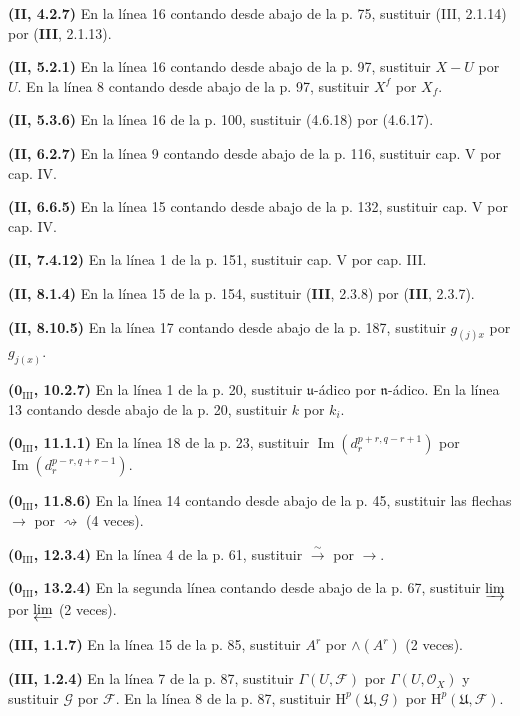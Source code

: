 \documentclass[10pt,oneside]{book}
\providecommand{\setmin}{-}%
\begin{document}
\noindent\textbf{(II, 4.2.7)} En la línea 16 contando desde abajo de la p. 75,
sustituir (III, 2.1.14) por (\textbf{III}, 2.1.13).

\noindent\textbf{(II, 5.2.1)} En la línea 16 contando desde abajo de la p. 97,
sustituir $X\setmin U$ por $U$. En la línea 8 contando desde abajo de la p. 97,
sustituir $X^f$ por $X_f$.

\noindent\textbf{(II, 5.3.6)} En la línea 16 de la p. 100, sustituir (4.6.18)
por (4.6.17).

\noindent\textbf{(II, 6.2.7)} En la línea 9 contando desde abajo de la p. 116,
sustituir cap. V por cap. IV.

\noindent\textbf{(II, 6.6.5)} En la línea 15 contando desde abajo de la p.
132, sustituir cap. V por cap. IV.

\noindent\textbf{(II, 7.4.12)} En la línea 1 de la p. 151, sustituir cap. V
por cap. III.

\noindent\textbf{(II, 8.1.4)} En la línea 15 de la p. 154, sustituir (\textbf{III},
2.3.8) por (\textbf{III}, 2.3.7).

\noindent\textbf{(II, 8.10.5)} En la línea 17 contando desde abajo de la p.
187, sustituir $g_{(j)x}$ por $g_{j(x)}$.

\noindent\textbf{($\mathbf 0_{\mathrm{III}}$, 10.2.7)} En la línea 1 de la p. 20,
sustituir $\mathfrak u$-ádico por $\mathfrak n$-ádico. En la línea 13 contando desde abajo
de la p. 20, sustituir $k$ por $k_i$.

\noindent\textbf{($\mathbf 0_{\mathrm{III}}$, 11.1.1)} En la línea 18 de la p. 23,
sustituir $\operatorname{Im}(d_r^{p+r,q-r+1})$ por
$\operatorname{Im}(d_r^{p-r,q+r-1})$.

\noindent\textbf{($\mathbf 0_{\mathrm{III}}$, 11.8.6)} En la línea 14 contando desde
abajo de la p. 45, sustituir las flechas $\to$ por $\rightsquigarrow$ (4 veces).

\noindent\textbf{($\mathbf 0_{\mathrm{III}}$, 12.3.4)} En la línea 4 de la p. 61,
sustituir $\xrightarrow{\sim}$ por $\to$.

\noindent\textbf{($\mathbf 0_{\mathrm{III}}$, 13.2.4)} En la segunda línea contando
desde abajo de la p. 67, sustituir $\varinjlim$ por $\varprojlim$ (2 veces).

\noindent\textbf{(III, 1.1.7)} En la línea 15 de la p. 85, sustituir $A^r$ por
$\wedge(A^r)$ (2 veces).

\noindent\textbf{(III, 1.2.4)} En la línea 7 de la p. 87, sustituir
$\Gamma(U,\mathscr F)$ por $\Gamma(U,\mathscr O_X)$ y sustituir $\mathscr G$
por $\mathscr F$. En la línea 8 de la p. 87, sustituir
$\mathrm H^p(\mathfrak U,\mathscr G)$ por $\mathrm H^p(\mathfrak U,\mathscr F)$.
\end{document}
